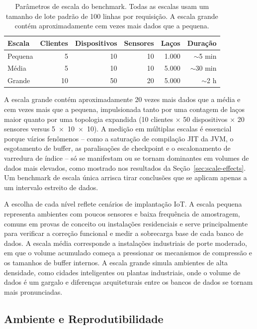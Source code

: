 \begin{table}[t]
  \centering
  \caption{Parâmetros de escala do benchmark. Todas as escalas usam um tamanho de lote padrão
    de 100 linhas por requisição. A escala grande contém aproximadamente cem vezes mais dados
  que a pequena.}
  \label{tab:scales}
  \begin{tabular}{lrrrrr}
    \hline
    \textbf{Escala} & \textbf{Clientes} & \textbf{Dispositivos} & \textbf{Sensores} & \textbf{Laços} & \textbf{Duração} \\
    \hline
    Pequena &  5 & 10 & 10 & 1.000 & ${\sim}$5 min \\
    Média   &  5 & 10 & 10 & 5.000 & ${\sim}$30 min \\
    Grande  & 10 & 50 & 20 & 5.000 & ${\sim}$2 h \\
    \hline
  \end{tabular}
\end{table}

A escala grande contém aproximadamente 20 vezes mais dados que a média e cem vezes mais
que a pequena, impulsionada tanto por uma contagem de laços maior quanto por uma topologia
expandida (10 clientes $\times$ 50 dispositivos $\times$ 20 sensores versus
5~$\times$~10~$\times$~10). A medição em múltiplas escalas é essencial porque vários fenômenos -- como a saturação de
compilação JIT da JVM, o esgotamento de buffer, as paralisações de checkpoint e o
escalonamento de varredura de índice -- só se manifestam ou se tornam dominantes em volumes
de dados mais elevados, como mostrado nos resultados da Seção~\ref{sec:scale-effects}. Um
benchmark de escala única arrisca tirar conclusões que se aplicam apenas a um intervalo
estreito de dados.

A escolha de cada nível reflete cenários de implantação IoT. A escala pequena representa ambientes com poucos
sensores e baixa frequência de amostragem, comuns em provas de conceito ou instalações
residenciais e serve principalmente para verificar a correção funcional e medir a sobrecarga
base de cada banco de dados. A escala média corresponde a instalações industriais de porte moderado, em que o volume acumulado
começa a pressionar os mecanismos de compressão e os tamanhos de buffer internos. A escala
grande simula ambientes de alta densidade, como cidades inteligentes ou plantas industriais, onde o volume de
dados é um gargalo e diferenças arquiteturais entre os bancos de dados se tornam
mais pronunciadas.

\subsection{Ambiente e Reprodutibilidade}
\label{sec:infrastructure}

